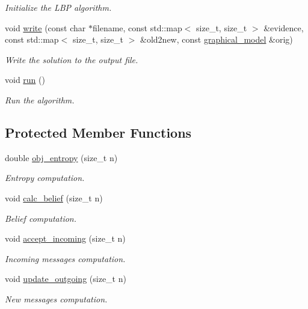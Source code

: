 \begin{DoxyCompactItemize}
\begin{DoxyCompactList}\small\item\em Initialize the L\+B\+P algorithm. \end{DoxyCompactList}\item 
void \hyperlink{classmerlin_1_1lbp_a410a15a1db43892eab80fe3fae041aa3}{write} (const char $\ast$filename, const std\+::map$<$ size\+\_\+t, size\+\_\+t $>$ \&evidence, const std\+::map$<$ size\+\_\+t, size\+\_\+t $>$ \&old2new, const \hyperlink{classmerlin_1_1graphical__model}{graphical\+\_\+model} \&orig)
\begin{DoxyCompactList}\small\item\em Write the solution to the output file. \end{DoxyCompactList}\item 
void \hyperlink{classmerlin_1_1lbp_afa31a31b0cfd63590d57cb453a6ab751}{run} ()
\begin{DoxyCompactList}\small\item\em Run the algorithm. \end{DoxyCompactList}\end{DoxyCompactItemize}
\subsection*{Protected Member Functions}
\begin{DoxyCompactItemize}
\item 
double \hyperlink{classmerlin_1_1lbp_a7970c64fc5ea704345d85bbdeda483ff}{obj\+\_\+entropy} (size\+\_\+t n)
\begin{DoxyCompactList}\small\item\em Entropy computation. \end{DoxyCompactList}\item 
void \hyperlink{classmerlin_1_1lbp_a48e9c7a9302829c21e6fd26f425e0237}{calc\+\_\+belief} (size\+\_\+t n)
\begin{DoxyCompactList}\small\item\em Belief computation. \end{DoxyCompactList}\item 
void \hyperlink{classmerlin_1_1lbp_a861d70a75592462bfe44aed5eda6407a}{accept\+\_\+incoming} (size\+\_\+t n)
\begin{DoxyCompactList}\small\item\em Incoming messages computation. \end{DoxyCompactList}\item 
void \hyperlink{classmerlin_1_1lbp_a05d07707c1eb9824c0e762ab0a3d80be}{update\+\_\+outgoing} (size\+\_\+t n)
\begin{DoxyCompactList}\small\item\em New messages computation. \end{DoxyCompactList}\end{DoxyCompactItemize}
